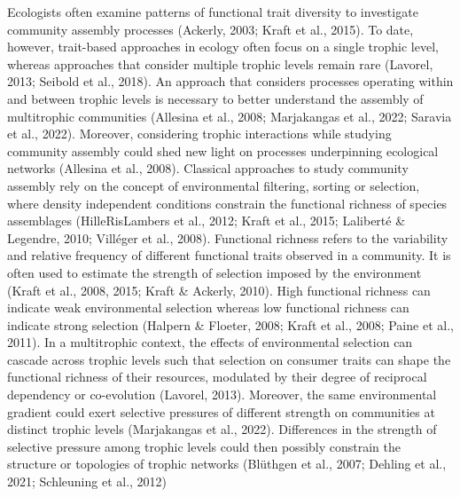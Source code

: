 \documentclass[
]{agujournal2019}
\begin{document}
Ecologists often examine patterns of functional trait diversity to
investigate community assembly processes (Ackerly, 2003; Kraft et al.,
2015). To date, however, trait-based approaches in ecology often focus
on a single trophic level, whereas approaches that consider multiple
trophic levels remain rare (Lavorel, 2013; Seibold et al., 2018). An
approach that considers processes operating within and between trophic
levels is necessary to better understand the assembly of multitrophic
communities (Allesina et al., 2008; Marjakangas et al., 2022; Saravia et
al., 2022). Moreover, considering trophic interactions while studying
community assembly could shed new light on processes underpinning
ecological networks (Allesina et al., 2008). Classical approaches to
study community assembly rely on the concept of environmental filtering,
sorting or selection, where density independent conditions constrain the
functional richness of species assemblages (HilleRisLambers et al.,
2012; Kraft et al., 2015; Laliberté \& Legendre, 2010; Villéger et al.,
2008). Functional richness refers to the variability and relative
frequency of different functional traits observed in a community. It is
often used to estimate the strength of selection imposed by the
environment (Kraft et al., 2008, 2015; Kraft \& Ackerly, 2010). High
functional richness can indicate weak environmental selection whereas
low functional richness can indicate strong selection (Halpern \&
Floeter, 2008; Kraft et al., 2008; Paine et al., 2011). In a
multitrophic context, the effects of environmental selection can cascade
across trophic levels such that selection on consumer traits can shape
the functional richness of their resources, modulated by their degree of
reciprocal dependency or co-evolution (Lavorel, 2013). Moreover, the
same environmental gradient could exert selective pressures of different
strength on communities at distinct trophic levels (Marjakangas et al.,
2022). Differences in the strength of selective pressure among trophic
levels could then possibly constrain the structure or topologies of
trophic networks (Blüthgen et al., 2007; Dehling et al., 2021;
Schleuning et al., 2012)
\end{document}

